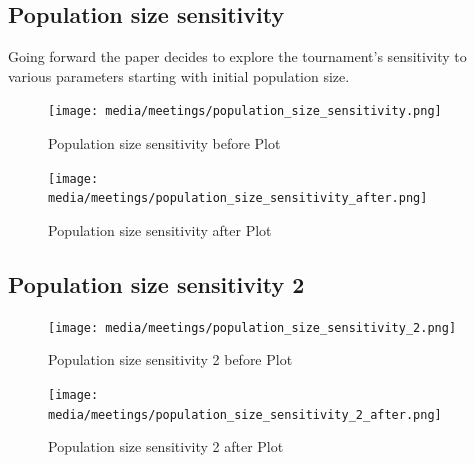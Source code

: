 \subsection{Population size sensitivity}
Going forward the paper decides to explore the tournament's sensitivity to various parameters starting with initial population size.
\begin{figure}[H]
    \centering
    \texttt{[image: media/meetings/population\_size\_sensitivity.png]}
    \caption{Population size sensitivity before Plot}
\end{figure}
\begin{figure}[H]
    \centering
    \texttt{[image: media/meetings/population\_size\_sensitivity\_after.png]}
    \caption{Population size sensitivity after Plot}
\end{figure}

\subsection{Population size sensitivity 2}
\begin{figure}[H]
    \centering
    \texttt{[image: media/meetings/population\_size\_sensitivity\_2.png]}
    \caption{Population size sensitivity 2 before Plot}
\end{figure}
\begin{figure}[H]
    \centering
    \texttt{[image: media/meetings/population\_size\_sensitivity\_2\_after.png]}
    \caption{Population size sensitivity 2 after Plot}
\end{figure}

